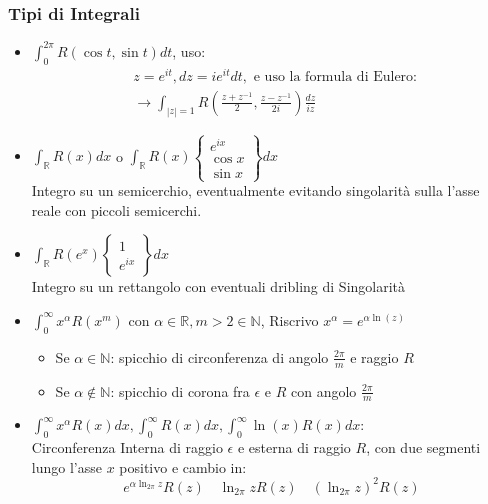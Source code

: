 \documentclass[a4paper,notitlepage]{report}%
\newcommand{\N}{\mathbb{N}}%
\newcommand{\R}{\mathbb{R}}%
\begin{document}
\begin{multicols*}{2}
\subsubsection{Tipi di Integrali}
\begin{itemize}
    \item $\int_0^{2\pi}R(\cos{t},\sin{t})dt$, uso:\begin{align*}
        &z= e^{it}, dz= ie^{it} dt, \text{ e uso la formula di Eulero: }\\
        &\rightarrow \int_{ |z | = 1} R\left(\frac{z+z^{-1}}{2},\frac{z-z^{-1}}{2i}\right) \frac{dz}{iz}
    \end{align*}
    \item $\int_\R R(x)dx$ o $\int_\R R(x)\left\{\begin{array}{l}
        e^{ix}\\
        \cos{x}\\
        \sin{x}
    \end{array}\right\}dx$\\
    Integro su un semicerchio, eventualmente evitando singolarità sulla l'asse reale con piccoli semicerchi.
    \item $\int_\R R(e^{x})\left\{\begin{array}{l}
        1\\
        e^{ix}
    \end{array}\right\} dx$\\
    Integro su un rettangolo con eventuali dribling di Singolarità
    \item $\int_0^\infty x^\alpha R(x^m)$ con $\alpha\in\R, m>2\in\N$,
    Riscrivo $x^\alpha = e^{\alpha \ln (z)}$
    \begin{itemize}
        \item Se $\alpha\in\N$: spicchio di circonferenza di angolo $\frac{2\pi}{m}$ e raggio $R$
        \item Se $\alpha\notin\N$: spicchio di corona fra $\epsilon$ e $R$ con angolo $\frac{2\pi}{m}$
    \end{itemize}
    \item $\int_0^\infty x^\alpha R(x) dx, \int_0^\infty R(x)dx, \int_0^\infty \ln(x)R(x) dx$:\\
        Circonferenza Interna di raggio $\epsilon$ e esterna di raggio $R$, con due segmenti lungo l'asse $x$ positivo e cambio in:
        \[
            e^{\alpha \ln_{2\pi}z}R(z) \quad \ln_{2\pi}z R(z) \quad (\ln_{2\pi}z)^2 R(z)
        \]
\end{itemize}



\end{multicols*}
\end{document}
